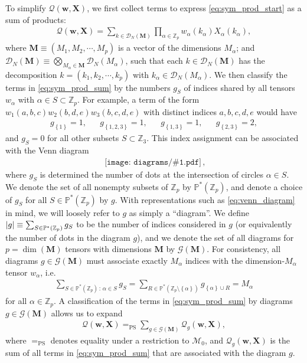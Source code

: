 \documentclass[nofootinbib,notitlepage,11pt]{revtex4-2}
\newcommand{\p}[1]{\left(#1\right)} %
\renewcommand{\set}[1]{\left\{#1\right\}} %
\newcommand{\m}{\bm} %
\newcommand{\1}{\mathds{1}}
\newcommand{\D}{\mathcal{D}}
\newcommand{\G}{\mathcal{G}}
\newcommand{\M}{\mathcal{M}}
\newcommand{\Q}{\mathcal{Q}}
\newcommand{\PP}{\mathbb{P}}
\newcommand{\ZZ}{\mathbb{Z}}
\newcommand{\EQPS}{=_{\text{PS}}}
\newcommand{\diagram}[1]
{\,\texttt{[image: diagrams/\#1.pdf]}\,}
\begin{document}
To simplify $\Q\p{\m w,\m X}$, we first collect terms to express
\eqref{eq:sym_prod_start} as a sum of products:
\begin{align}
  \Q\p{\m w,\m X} = \sum_{k\in\D_N\p{\m M}} \prod_{\alpha\in\ZZ_p}
  w_\alpha\p{k_\alpha} X_\alpha\p{k_\alpha},
  \label{eq:sym_prod_sum}
\end{align}
where $\m M\equiv\p{M_1,M_2,\cdots,M_p}$ is a vector of the dimensions
$M_\alpha$; and
$\D_N\p{\m M}\equiv\bigotimes_{M_\alpha\in\m M}\D_N\p{M_\alpha}$, such
that each $k\in\D_N\p{\m M}$ has the decomposition
$k=\p{k_1,k_2,\cdots,k_p}$ with $k_\alpha\in\D_N\p{M_\alpha}$.  We
then classify the terms in \eqref{eq:sym_prod_sum} by the numbers
$g_S$ of indices shared by all tensors $w_\alpha$ with
$\alpha\in S\subset\ZZ_p$.  For example, a term of the form
$w_1\p{a,b,c} w_2\p{b,d,e} w_3\p{b,c,d,e}$ with distinct indices
$a,b,c,d,e$ would have
\begin{align}
  g_{\set{1}} = 1,
  &&
  g_{\set{1,2,3}} = 1,
  &&
  g_{\set{1,3}} = 1,
  &&
  g_{\set{2,3}} = 2,
\end{align}
and $g_S=0$ for all other subsets $S\subset\ZZ_3$.  This index
assignment can be associated with the Venn diagram
\begin{align}
  \diagram{example_123},
  \label{eq:venn_diagram}
\end{align}
where $g_S$ is determined the number of dots at the intersection of
circles $\alpha\in S$.  We denote the set of all nonempty subsets of
$\ZZ_p$ by $\PP^*\p{\ZZ_p}$, and denote a choice of $g_S$ for all
$S\in\PP^*\p{\ZZ_p}$ by $g$.  With representations such as
\eqref{eq:venn_diagram} in mind, we will loosely refer to $g$ as
simply a ``diagram''.  We define
$\abs{g}\equiv\sum_{S\in\PP^*\p{\ZZ_p}}g_S$ to be the number of
indices considered in $g$ (or equivalently the number of dots in the
diagram $g$), and we denote the set of all diagrams for
$p=\dim\p{\m M}$ tensors with dimensions $\m M$ by $\G\p{\m M}$.  For
consistency, all diagrams $g\in\G\p{\m M}$ must associate exactly
$M_\alpha$ indices with the dimension-$M_\alpha$ tensor $w_\alpha$,
i.e.
\begin{align}
  \sum_{S\in\PP^*\p{\ZZ_p}\,:\,\alpha\in S} g_S
  = \sum_{R\in\PP^*\p{\ZZ_p\setminus\set{\alpha}}} g_{\set{\alpha}\cup R}
  = M_\alpha
\end{align}
for all $\alpha\in\ZZ_p$.  A classification of the terms in
\eqref{eq:sym_prod_sum} by diagrams $g\in\G\p{\m M}$ allows us to
expand
\begin{align}
  \Q\p{\m w,\m X} \EQPS \sum_{g\in\G\p{\m M}} \Q_g\p{\m w,\m X},
  \label{eq:sym_prod_diagrams}
\end{align}
where $\EQPS$ denotes equality under a restriction to $\M_0$, and
$\Q_g\p{\m w,\m X}$ is the sum of all terms in \eqref{eq:sym_prod_sum}
that are associated with the diagram $g$.
\end{document}
